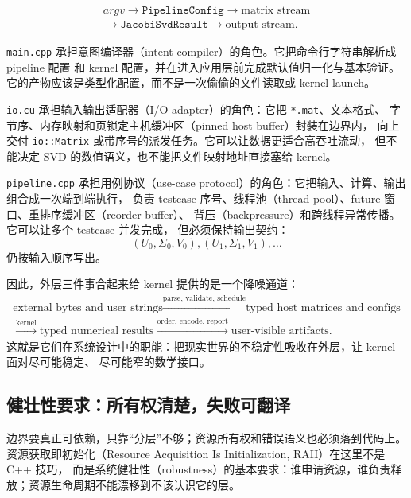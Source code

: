 \[
    \begin{gathered}
        argv
        \longrightarrow
        \texttt{PipelineConfig}
        \longrightarrow
        \text{matrix stream} \\
        \longrightarrow
        \texttt{JacobiSvdResult}
        \longrightarrow
        \text{output stream}.
    \end{gathered}
\]

\texttt{main.cpp} 承担意图编译器（intent compiler）的角色。它把命令行字符串解析成 pipeline 配置
和 kernel 配置，并在进入应用层前完成默认值归一化与基本验证。
它的产物应该是类型化配置，而不是一次偷偷的文件读取或 kernel launch。

\texttt{io.cu} 承担输入输出适配器（I/O adapter）的角色：它把 \texttt{*.mat}、文本格式、
字节序、内存映射和页锁定主机缓冲区（pinned host buffer）封装在边界内，
向上交付 \texttt{io::Matrix} 或带序号的派发任务。它可以让数据更适合高吞吐流动，
但不能决定 SVD 的数值语义，也不能把文件映射地址直接塞给 kernel。

\texttt{pipeline.cpp} 承担用例协议（use-case protocol）的角色：它把输入、计算、输出组合成一次端到端执行，
负责 testcase 序号、线程池（thread pool）、future 窗口、重排序缓冲区（reorder buffer）、
背压（backpressure）和跨线程异常传播。它可以让多个 testcase 并发完成，
但必须保持输出契约：
\[
    (U_0,\Sigma_0,V_0),
    (U_1,\Sigma_1,V_1),
    \ldots
\]
仍按输入顺序写出。

因此，外层三件事合起来给 kernel 提供的是一个降噪通道：
\[
    \begin{gathered}
        \text{external bytes and user strings}
        \xrightarrow{\text{parse, validate, schedule}}
        \text{typed host matrices and configs} \\
        \xrightarrow{\text{kernel}}
        \text{typed numerical results}
        \xrightarrow{\text{order, encode, report}}
        \text{user-visible artifacts}.
    \end{gathered}
\]
这就是它们在系统设计中的职能：把现实世界的不稳定性吸收在外层，让 kernel 面对尽可能稳定、
尽可能窄的数学接口。

\subsection{健壮性要求：所有权清楚，失败可翻译}

边界要真正可依赖，只靠“分层”不够；资源所有权和错误语义也必须落到代码上。
资源获取即初始化（Resource Acquisition Is Initialization, RAII）在这里不是 C++ 技巧，
而是系统健壮性（robustness）的基本要求：谁申请资源，谁负责释放；资源生命周期不能漂移到不该认识它的层。

